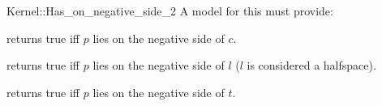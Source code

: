 \begin{ccRefFunctionObjectConcept}{Kernel::Has_on_negative_side_2}
A model for this must provide:


{returns true iff $p$ lies on the negative side of $c$.}

{returns true iff $p$ lies on the negative side of $l$ 
($l$ is considered a halfspace).}

{returns true iff $p$ lies on the negative side of $t$.}

\ccIsModel{}

\end{ccRefFunctionObjectConcept}

